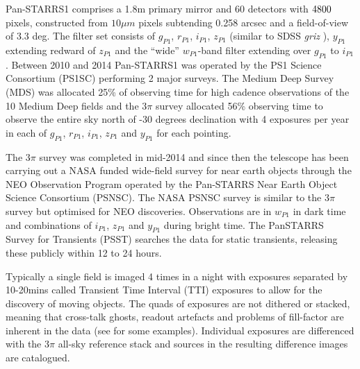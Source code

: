 \message{ !name(blank.tex)}\documentclass[a4paper,fleqn,usenatbib]{mnras}
\begin{document}


Pan-STARRS1 comprises a 1.8m primary mirror \citep{Kaiser10} and 60 detectors with $4800\time 4800$ pixels, constructed from $10\mu m$ pixels subtending 0.258 arcsec \citep{Magnier13} and a field-of-view of 3.3 deg.  The filter set consists of $g_{P1}$, $r_{P1}$, $i_{P1}$, $z_{P1}$ (similar to SDSS \textit{griz} \citep{York00}), $y_{P1}$ extending
redward of $z_{P1}$ and the ``wide'' $w_{P1}$-band filter extending over $g_{P1}$ to $i_{P1}$ \citep{Tonry12b}.  Between 2010 and 2014 Pan-STARRS1 was operated by the PS1 Science Consortium (PS1SC) performing 2 major surveys.  The Medium Deep Survey (MDS) was allocated 25\% of observing time for high cadence observations of the 10 Medium Deep fields and the $3\pi$ survey allocated 56\% observing time to observe the entire sky north of -30 degrees declination with 4 exposures per year in each of $g_{P1}$, $r_{P1}$, $i_{P1}$, $z_{P1}$ and $y_{P1}$ for each pointing.

The $3\pi$ survey was completed in mid-2014 and since then the telescope has been carrying out a NASA funded wide-field survey for near earth objects through the NEO Observation Program operated by the Pan-STARRS Near Earth Object Science Consortium (PSNSC).  The NASA PSNSC survey is similar to the $3\pi$ survey but optimised for NEO discoveries.  Observations are in $w_{P1}$ in dark time and combinations of $i_{P1}$, $z_{P1}$ and $y_{P1}$ during bright time.  The PanSTARRS Survey for Transients (PSST) \citep{Huber15a, Inserra13} searches the data for static transients, releasing these publicly within 12 to 24 hours.

Typically a single field is imaged 4 times in a night with exposures separated by 10-20mins called Transient Time Interval (TTI) exposures to allow for the discovery of moving objects.  The quads of exposures are not dithered or stacked, meaning that cross-talk ghosts, readout artefacts and problems of fill-factor are inherent in the data (see \citet{Denneau13} for some examples).  Individual exposures are differenced with the $3\pi$ all-sky reference stack and sources in the resulting difference images are catalogued.
\end{document}
